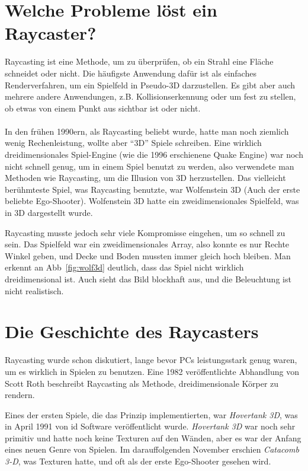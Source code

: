 \documentclass[a4paper,12pt]{report}
\begin{document}
\section{Welche Probleme löst ein Raycaster?}
Raycasting ist eine Methode, um zu überprüfen, ob ein Strahl eine Fläche schneidet oder nicht. Die häufigste Anwendung dafür ist als einfaches Renderverfahren, um ein Spielfeld in Pseudo-3D darzustellen. Es gibt aber auch mehrere andere Anwendungen, z.B. Kollisionserkennung oder um fest zu stellen, ob etwas von einem Punkt aus sichtbar ist oder nicht.

\paragraph*{}
In den frühen 1990ern, als Raycasting beliebt wurde, hatte man noch ziemlich wenig Rechenleistung, wollte aber ``3D'' Spiele schreiben. Eine wirklich dreidimensionales Spiel-Engine (wie die 1996 erschienene Quake Engine) war noch nicht schnell genug, um in einem Spiel benutzt zu werden, also verwendete man Methoden wie Raycasting, um die Illusion von 3D herzustellen. Das vielleicht berühmteste Spiel, was Raycasting benutzte, war Wolfenstein 3D (Auch der erste beliebte Ego-Shooter). Wolfenstein 3D hatte ein zweidimensionales Spielfeld, was in 3D dargestellt wurde.

Raycasting musste jedoch sehr viele Kompromisse eingehen, um so schnell zu sein. Das Spielfeld war ein zweidimensionales Array, also konnte es nur Rechte Winkel geben, und Decke und Boden mussten immer gleich hoch bleiben. Man erkennt an Abb~\ref{fig:wolf3d} deutlich, dass das Spiel nicht wirklich dreidimensional ist. Auch sieht das Bild blockhaft aus, und die Beleuchtung ist nicht realistisch.

\section{Die Geschichte des Raycasters}
Raycasting wurde schon diskutiert, lange bevor PCs leistungsstark genug waren, um es wirklich in Spielen zu benutzen. Eine 1982 veröffentlichte Abhandlung von Scott Roth beschreibt Raycasting als Methode, dreidimensionale Körper zu rendern.

Eines der ersten Spiele, die das Prinzip implementierten, war \textit{Hovertank 3D}, was in April 1991 von id Software veröffentlicht wurde. \textit{Hovertank 3D} war noch sehr primitiv und hatte noch keine Texturen auf den Wänden, aber es war der Anfang eines neuen Genre von Spielen. Im darauffolgenden November erschien \textit{Catacomb 3-D}, was Texturen hatte, und oft als der erste Ego-Shooter gesehen wird.
\end{document}
